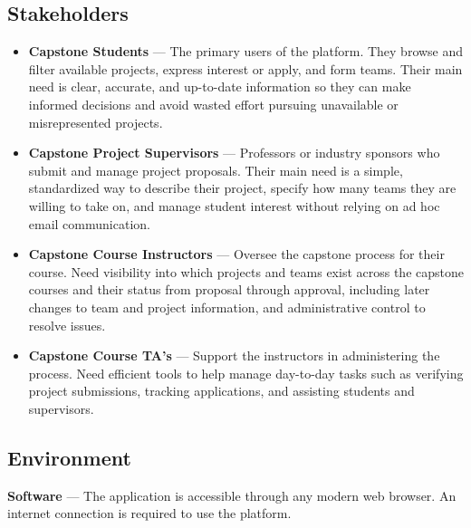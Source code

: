 \documentclass{article}
\begin{document}
\subsection{Stakeholders}

\begin{itemize}
    \item \textbf{Capstone Students} --- The primary users of the platform.
          They browse and filter available projects, express interest or apply, and
          form teams. Their main need is clear, accurate, and up-to-date
          information so they can make informed decisions and avoid wasted effort
          pursuing unavailable or misrepresented projects.

    \item \textbf{Capstone Project Supervisors} --- Professors or industry
          sponsors who submit and manage project proposals. Their main need is a
          simple, standardized way to describe their project, specify how many
          teams they are willing to take on, and manage student interest without
          relying on ad hoc email communication.

    \item \textbf{Capstone Course Instructors} --- Oversee the capstone
          process for their course. Need visibility into which projects and teams
          exist across the capstone courses and their status from proposal through
          approval, including later changes to team and project information, and
          administrative control to resolve issues.

    \item \textbf{Capstone Course TA's} --- Support the instructors in
          administering the process. Need efficient tools to help manage
          day-to-day tasks such as verifying project submissions, tracking
          applications, and assisting students and supervisors.
\end{itemize}

\subsection{Environment}


\textbf{Software} --- The application is accessible through any modern web
browser. An internet connection is required to use the platform.
\end{document}
